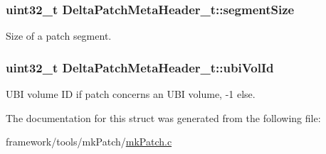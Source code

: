 \subsubsection[{\texorpdfstring{segment\+Size}{segmentSize}}]{\setlength{\rightskip}{0pt plus 5cm}uint32\+\_\+t Delta\+Patch\+Meta\+Header\+\_\+t\+::segment\+Size}\hypertarget{struct_delta_patch_meta_header__t_a2be92cdf178eca749b374d77bd926255}{}\label{struct_delta_patch_meta_header__t_a2be92cdf178eca749b374d77bd926255}


Size of a patch segment. 

\subsubsection[{\texorpdfstring{ubi\+Vol\+Id}{ubiVolId}}]{\setlength{\rightskip}{0pt plus 5cm}uint32\+\_\+t Delta\+Patch\+Meta\+Header\+\_\+t\+::ubi\+Vol\+Id}\hypertarget{struct_delta_patch_meta_header__t_a7ec5f36b04569ceb022443953ba4cc01}{}\label{struct_delta_patch_meta_header__t_a7ec5f36b04569ceb022443953ba4cc01}


U\+BI volume ID if patch concerns an U\+BI volume, -\/1 else. 



The documentation for this struct was generated from the following file\+:\begin{DoxyCompactItemize}
\item 
framework/tools/mk\+Patch/\hyperlink{mk_patch_8c}{mk\+Patch.\+c}\end{DoxyCompactItemize}
